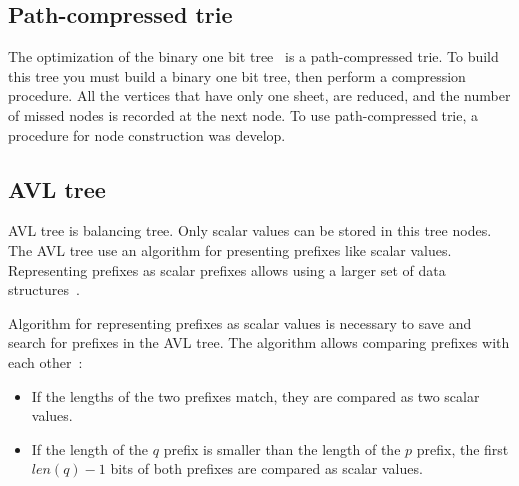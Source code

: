 \documentclass[conference]{IEEEtran}
\begin{document}
        \subsection{Path-compressed trie}
            The optimization of the binary one bit tree~\cite{ruiz2001survey} is a path-compressed trie. 
            To build this tree you must build a binary one bit tree, 
            then perform a compression procedure. All the vertices that have only one sheet, 
            are reduced, and the number of missed nodes is recorded at the next node. 
            To use path-compressed trie, a procedure for node construction was develop.
        \subsection{AVL tree}
            AVL tree is balancing tree. 
            Only scalar values can be stored in this tree nodes.
            The AVL tree use an algorithm for presenting prefixes like scalar values.
            Representing prefixes as scalar prefixes allows using a larger set of data structures~\cite{behdadfar2009scalar}. 

                Algorithm for representing prefixes as scalar values 
                is necessary to save and search for prefixes in the AVL tree. 
                The algorithm allows comparing prefixes with each other~\cite{behdadfar2011coded}:
                \begin{itemize}
                    \item If the lengths of the two prefixes match, they are compared as two scalar values.
                    \item If the length of the $q$ prefix is smaller than the length of the $p$ prefix, 
                        the first $len(q) - 1$ bits of both prefixes are compared as scalar values.
                \end{itemize}
    
\end{document}
